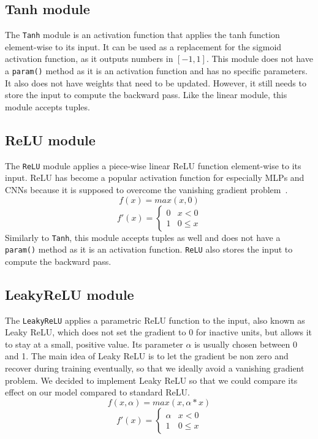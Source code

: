 \documentclass[10pt,conference,compsocconf]{IEEEtran}
\begin{document}
 
 
\subsection{Tanh module}
The \texttt{Tanh} module is an activation function that applies the tanh function element-wise to its input. It can be used as a replacement for the sigmoid activation function, as it outputs numbers in $[-1,1]$. This module does not have a \texttt{param()} method as it is an activation function and has no specific parameters. It also does not have weights that need to be updated. However, it still needs to store the input to compute the backward pass. Like the linear module, this module accepts tuples.

%


\subsection{ReLU module}
The \texttt{ReLU} module applies a piece-wise linear ReLU function element-wise to its input. ReLU has become a popular activation function for especially MLPs and CNNs because it is supposed to overcome the vanishing gradient problem~\cite{relu}.
\begin{equation}
    f(x) = max(x, 0)
\end{equation}
\[ f'(x) =
    \begin{cases} 
      0 & x < 0 \\
      1 & 0\leq x 
    \end{cases}
\]
Similarly to \texttt{Tanh}, this module accepts tuples as well and does not have a \texttt{param()} method as it is an activation function. \texttt{ReLU} also stores the input to compute the backward pass.

%
\subsection{LeakyReLU module}
The \texttt{LeakyReLU} applies a parametric ReLU function to the input, also known as Leaky ReLU, which does not set the gradient to 0 for inactive units, but allows it to stay at a small, positive value. Its parameter $\alpha$ is usually chosen between 0 and 1. %
The main idea of Leaky ReLU is to let the gradient be non zero and recover during training eventually, so that we ideally avoid a vanishing gradient problem. We decided to implement Leaky ReLU so that we could compare its effect on our model compared to standard ReLU.  
\begin{equation}
    f(x, \alpha) = max(x, \alpha*x)
\end{equation}
\[ f'(x) =
    \begin{cases} 
      \alpha & x < 0 \\
      1 & 0\leq x 
    \end{cases}
\]
\end{document}
